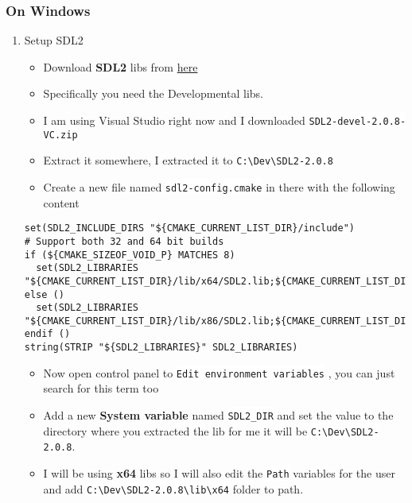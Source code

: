 \documentclass[a4paper,12pt]{article}
\let\OldTexttt\texttt
\renewcommand{\texttt}[1]{\OldTexttt{\footnotesize\colorbox{background}{\textcolor{foreground}{#1}}}}
\begin{document}
\subsubsection{On Windows}
\label{sec:orgeaffb0c}
\begin{enumerate}
\item Setup SDL2
\label{sec:org325805b}
\begin{itemize}
\item Download \textbf{SDL2} libs from \href{https://www.libsdl.org/download-2.0.php}{here}
\item Specifically you need the Developmental libs.
\item I am using Visual Studio right now and I downloaded \texttt{SDL2-devel-2.0.8-VC.zip}
\item Extract it somewhere, I extracted it to \texttt{C:\textbackslash{}Dev\textbackslash{}SDL2-2.0.8}
\item Create a new file named \texttt{sdl2-config.cmake} in there with the following content
\end{itemize}

\lstset{language=cmake,label= ,caption= ,captionpos=b,numbers=none,language=cpp}
\begin{lstlisting}
set(SDL2_INCLUDE_DIRS "${CMAKE_CURRENT_LIST_DIR}/include")
# Support both 32 and 64 bit builds
if (${CMAKE_SIZEOF_VOID_P} MATCHES 8)
  set(SDL2_LIBRARIES "${CMAKE_CURRENT_LIST_DIR}/lib/x64/SDL2.lib;${CMAKE_CURRENT_LIST_DIR}/lib/x64/SDL2main.lib")
else ()
  set(SDL2_LIBRARIES "${CMAKE_CURRENT_LIST_DIR}/lib/x86/SDL2.lib;${CMAKE_CURRENT_LIST_DIR}/lib/x86/SDL2main.lib")
endif ()
string(STRIP "${SDL2_LIBRARIES}" SDL2_LIBRARIES)
\end{lstlisting}

\begin{itemize}
\item Now open control panel to \texttt{Edit environment variables} , you can just search for this term too
\item Add a new \textbf{System variable} named \texttt{SDL2\_DIR} and set the value to the directory
where you extracted the lib for me it will be \texttt{C:\textbackslash{}Dev\textbackslash{}SDL2-2.0.8}.
\item I will be using \textbf{x64} libs so I will also edit the \texttt{Path} variables for
the user and add \texttt{C:\textbackslash{}Dev\textbackslash{}SDL2-2.0.8\textbackslash{}lib\textbackslash{}x64} folder to path.
\end{itemize}


\end{enumerate}
\end{document}
